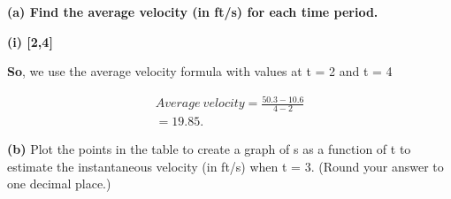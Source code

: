 \documentclass{report}
\begin{document}
    \bigbreak \noindent 
    \textbf{(a) Find the average velocity (in ft/s) for each time period.}
    
    \bigbreak \noindent 
    \textbf{(i) [2,4]}
    
    \bigbreak \noindent 
    \textbf{So}, we use the average velocity formula with values at t = 2 and t = 4
    
    \begin{align*}
        Average\ velocity = \frac{50.3-10.6}{4-2} \\
        = 19.85 
    .\end{align*}

    \bigbreak \noindent 
    \textbf{(b)} Plot the points in the table to create a graph of s as a function of t to estimate the instantaneous velocity (in ft/s) when t = 3. (Round your answer to one decimal place.)
    
    \bigbreak \noindent 
    
\end{document}

